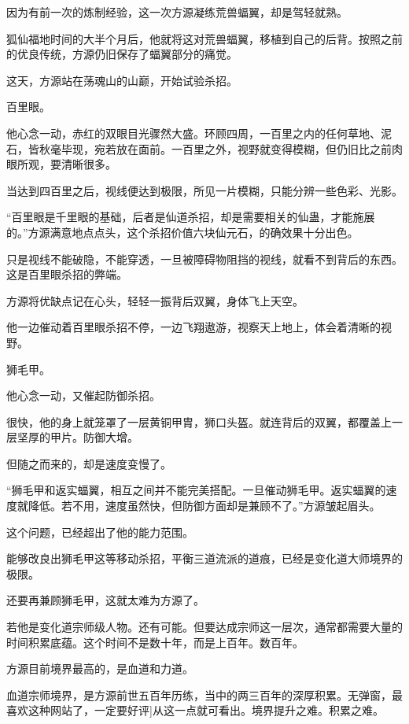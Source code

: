 
\begin{this_body}

因为有前一次的炼制经验，这一次方源凝练荒兽蝠翼，却是驾轻就熟。

狐仙福地时间的大半个月后，他就将这对荒兽蝠翼，移植到自己的后背。按照之前的优良传统，方源仍旧保存了蝠翼部分的痛觉。

这天，方源站在荡魂山的山巅，开始试验杀招。

百里眼。

他心念一动，赤红的双眼目光骤然大盛。环顾四周，一百里之内的任何草地、泥石，皆秋毫毕现，宛若放在面前。一百里之外，视野就变得模糊，但仍旧比之前肉眼所观，要清晰很多。

当达到四百里之后，视线便达到极限，所见一片模糊，只能分辨一些色彩、光影。

“百里眼是千里眼的基础，后者是仙道杀招，却是需要相关的仙蛊，才能施展的。”方源满意地点点头，这个杀招价值六块仙元石，的确效果十分出色。

只是视线不能破隐，不能穿透，一旦被障碍物阻挡的视线，就看不到背后的东西。这是百里眼杀招的弊端。

方源将优缺点记在心头，轻轻一振背后双翼，身体飞上天空。

他一边催动着百里眼杀招不停，一边飞翔遨游，视察天上地上，体会着清晰的视野。

狮毛甲。

他心念一动，又催起防御杀招。

很快，他的身上就笼罩了一层黄铜甲胄，狮口头盔。就连背后的双翼，都覆盖上一层坚厚的甲片。防御大增。

但随之而来的，却是速度变慢了。

“狮毛甲和返实蝠翼，相互之间并不能完美搭配。一旦催动狮毛甲。返实蝠翼的速度就降低。若不用，速度虽然快，但防御方面却是兼顾不了。”方源皱起眉头。

这个问题，已经超出了他的能力范围。

能够改良出狮毛甲这等移动杀招，平衡三道流派的道痕，已经是变化道大师境界的极限。

还要再兼顾狮毛甲，这就太难为方源了。

若他是变化道宗师级人物。还有可能。但要达成宗师这一层次，通常都需要大量的时间积累底蕴。这个时间不是数十年，而是上百年。数百年。

方源目前境界最高的，是血道和力道。

血道宗师境界，是方源前世五百年历练，当中的两三百年的深厚积累。无弹窗，最喜欢这种网站了，一定要好评]从这一点就可看出。境界提升之难。积累之难。


\end{this_body}
